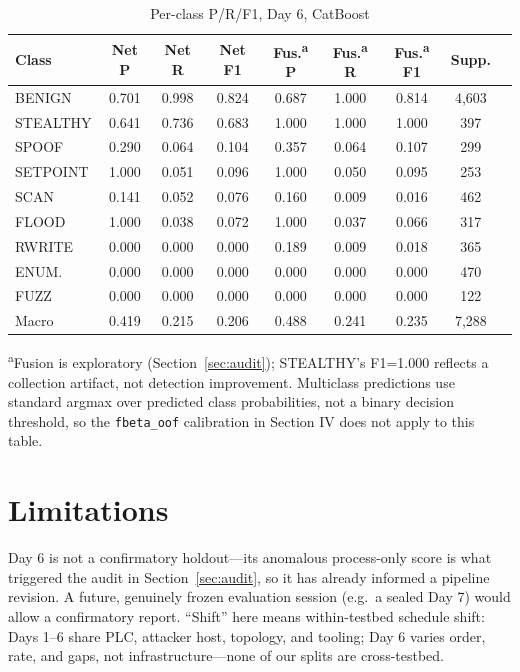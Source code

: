 \documentclass[conference]{IEEEtran}
\begin{document}
\begin{table}[t]
\caption{Per-class P/R/F1, Day 6, CatBoost}
\label{tab:perclass}
\centering
\scriptsize
\setlength{\tabcolsep}{2.5pt}
\begin{tabular}{lcccccccc}
\toprule
Class & Net P & Net R & Net F1 & Fus.\textsuperscript{a} P & Fus.\textsuperscript{a} R &
Fus.\textsuperscript{a} F1 & Supp. \\
\midrule
BENIGN    & 0.701 & 0.998 & 0.824 & 0.687 & 1.000 & 0.814 & 4{,}603 \\
STEALTHY  & 0.641 & 0.736 & 0.683 & 1.000 & 1.000 & 1.000 & 397 \\
SPOOF     & 0.290 & 0.064 & 0.104 & 0.357 & 0.064 & 0.107 & 299 \\
SETPOINT  & 1.000 & 0.051 & 0.096 & 1.000 & 0.050 & 0.095 & 253 \\
SCAN      & 0.141 & 0.052 & 0.076 & 0.160 & 0.009 & 0.016 & 462 \\
FLOOD     & 1.000 & 0.038 & 0.072 & 1.000 & 0.037 & 0.066 & 317 \\
RWRITE    & 0.000 & 0.000 & 0.000 & 0.189 & 0.009 & 0.018 & 365 \\
ENUM.     & 0.000 & 0.000 & 0.000 & 0.000 & 0.000 & 0.000 & 470 \\
FUZZ      & 0.000 & 0.000 & 0.000 & 0.000 & 0.000 & 0.000 & 122 \\
\midrule
Macro     & 0.419 & 0.215 & 0.206 & 0.488 & 0.241 & 0.235 & 7{,}288 \\
\bottomrule
\end{tabular}

\vspace{2pt}
\raggedright\footnotesize\textsuperscript{a}Fusion is exploratory (Section~\ref{sec:audit}); STEALTHY's
F1=1.000 reflects a collection artifact, not detection improvement. Multiclass predictions use standard
argmax over predicted class probabilities, not a binary decision threshold, so the \texttt{fbeta\_oof}
calibration in Section IV does not apply to this table.
\end{table}

\section{Limitations}
\label{sec:limitations}

Day 6 is not a confirmatory holdout---its anomalous process-only score is what triggered the audit in
Section~\ref{sec:audit}, so it has already informed a pipeline revision. A future, genuinely frozen
evaluation session (e.g.\ a sealed Day 7) would allow a confirmatory report. ``Shift'' here means
within-testbed schedule shift: Days 1--6 share PLC, attacker host, topology, and tooling; Day 6 varies
order, rate, and gaps, not infrastructure---none of our splits are cross-testbed.
\end{document}
